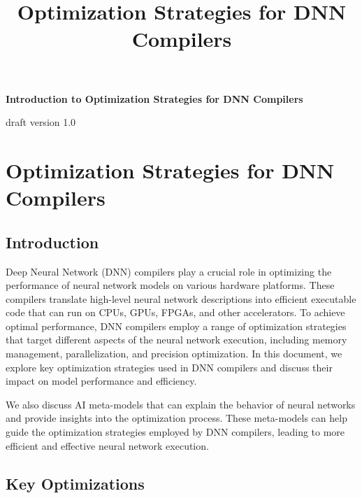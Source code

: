 \documentclass{article}
\begin{document}
\title{Optimization Strategies for DNN Compilers}

\begin{titlepage}
    \begin{center}
        \vspace*{1cm}
        
        \Huge
        \textbf{Introduction to Optimization Strategies for DNN Compilers}

        \vspace{0.5cm}
        \LARGE
        draft version 1.0
        
        \vspace{0.5cm}
    \end{center}
\end{titlepage}

\tableofcontents

\section{Optimization Strategies for DNN Compilers}

\subsection{Introduction}

Deep Neural Network (DNN) compilers play a crucial role in optimizing the performance of neural network models on various hardware platforms. These compilers translate high-level neural network descriptions into efficient executable code that can run on CPUs, GPUs, FPGAs, and other accelerators. To achieve optimal performance, DNN compilers employ a range of optimization strategies that target different aspects of the neural network execution, including memory management, parallelization, and precision optimization. In this document, we explore key optimization strategies used in DNN compilers and discuss their impact on model performance and efficiency.

We also discuss AI meta-models that can explain the behavior of neural networks and provide insights into the optimization process. These meta-models can help guide the optimization strategies employed by DNN compilers, leading to more efficient and effective neural network execution.

\subsection{Key Optimizations}
\end{document}
